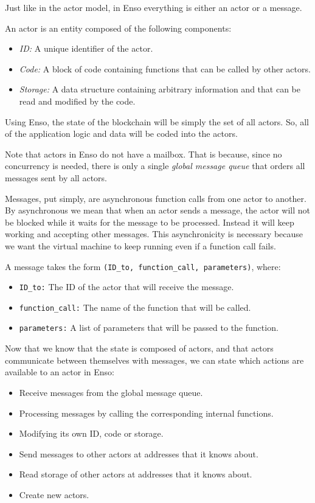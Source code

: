 \documentclass[conference]{IEEEtran}
\begin{document}
Just like in the actor model, in Enso everything is either an actor or a message.

An actor is an entity composed of the following components:

\begin{itemize}
	\item \textit{ID:} A unique identifier of the actor.
	\item \textit{Code:} A block of code containing functions that can be called by other actors.
	\item \textit{Storage:} A data structure containing arbitrary information and that can be read and modified by the code.
\end{itemize}

Using Enso, the state of the blockchain will be simply the set of all actors. So, all of the application logic and data will be coded into the actors.

Note that actors in Enso do not have a mailbox. That is because, since no concurrency is needed, there is only a single \textit{global message queue} that orders all messages sent by all actors.

Messages, put simply, are asynchronous function calls from one actor to another. By asynchronous we mean that when an actor sends a message, the actor will not be blocked while it waits for the message to be processed. Instead it will keep working and accepting other messages. This asynchronicity is necessary because we want the virtual machine to keep running even if a function call fails.

A message takes the form \texttt{(ID\_to, function\_call, parameters)}, where:

\begin{itemize}
	\item \texttt{ID\_to:} The ID of the actor that will receive the message.
	\item \texttt{function\_call:} The name of the function that will be called.
	\item \texttt{parameters:} A list of parameters that will be passed to the function.
\end{itemize}

Now that we know that the state is composed of actors, and that actors communicate between themselves with messages, we can state which actions are available to an actor in Enso:

\begin{itemize}
	\item Receive messages from the global message queue.
	\item Processing messages by calling the corresponding internal functions.
	\item Modifying its own ID, code or storage.
	\item Send messages to other actors at addresses that it knows about.
	\item Read storage of other actors at addresses that it knows about.
	\item Create new actors.
\end{itemize}
\end{document}
